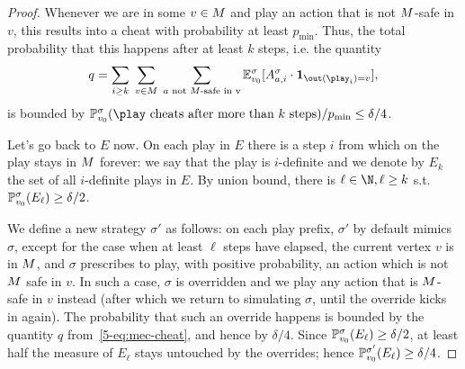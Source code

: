 \begin{proof}
 Whenever we are in some $ v\in M $ and play an action that is not $ M $-safe in $ v $, this results into a cheat with  probability at least $ p_{\min} $. Thus, the total probability that this happens after at least $ k $ steps, i.e. the quantity \begin{equation}\label{5-eq:mec-cheat}q= \sum_{i \geq k}\;\sum_{v\in \mec}\;\sum_{a \text{ not $ \mec $-safe in v}}\expv^\sigma_{\vinit}[ \actevent{\sigma}{a}{i}\cdot\indicator{ \out(\play_i)= v} ] , \end{equation}
 is bounded by $ \probm_{\vinit}^\sigma(\play \text{ cheats after more than $ k $ steps})/p_{\min} \leq \delta/4$.
 
 Let's go back to $ E $ now. On each play in $ E $ there is a step $ i $ from which on the play stays in $ M $ forever: we say that the play is $ i $-definite and we denote by $E_k$ the set of all $ i $-definite plays in $ E $. By union bound, there is $ \ell \in \N, \ell \geq k $ s.t. $ \mathbb{P}_{v_0}^\sigma(E_\ell)  \geq \delta/2$. 
 
 We define a new strategy $ \sigma' $ as follows: on each play prefix, $ \sigma' $ by default mimics $ \sigma $, except for the case when at least $ \ell $ steps have elapsed, the current vertex $ v $ is in $ M $, and $ \sigma $ prescribes to play, with positive probability, an action which is not $ M $ safe in $ v $. In such a case, $ \sigma $ is overridden and we play any action that is $ M $-safe in $ v $ instead (after which we return to simulating $ \sigma $, until the override kicks in again). The probability that such an override happens is bounded by the quantity $ q $ from~\cref{5-eq:mec-cheat}, and hence by $ \delta/4 $. Since  $ \mathbb{P}_{v_0}^\sigma(E_\ell)  \geq \delta/2$, at least half the measure of $ E_{\ell} $ stays untouched by the overrides; hence  $ \mathbb{P}_{v_0}^{\sigma'}(E_\ell)\geq \delta/4 $.
 

\end{proof}
